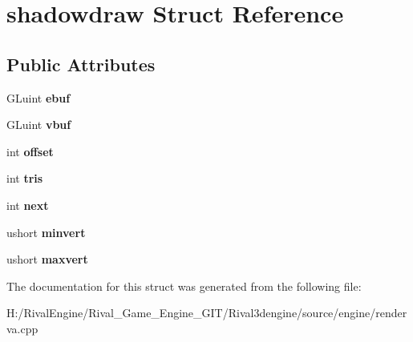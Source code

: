 \hypertarget{structshadowdraw}{}\section{shadowdraw Struct Reference}
\label{structshadowdraw}
\subsection*{Public Attributes}
\begin{DoxyCompactItemize}
\item 
\mbox{\label{structshadowdraw_a25b1392d77c3a07319fefe1782e7d95b}} 
G\+Luint {\bfseries ebuf}
\item 
\mbox{\label{structshadowdraw_a083ca69c763cac1ceaf7e893908b4a6d}} 
G\+Luint {\bfseries vbuf}
\item 
\mbox{\label{structshadowdraw_a301496aa1098b646b8eb2e47a01d5393}} 
int {\bfseries offset}
\item 
\mbox{\label{structshadowdraw_a4920a0cea65039924f56704ce01bf495}} 
int {\bfseries tris}
\item 
\mbox{\label{structshadowdraw_a85adde86f6235cc34c427780eea2b2fa}} 
int {\bfseries next}
\item 
\mbox{\label{structshadowdraw_a2000be2ccfad6949f1ad4a8038d62092}} 
ushort {\bfseries minvert}
\item 
\mbox{\label{structshadowdraw_a44cd3a21aefbce90dcd5c64c34e375b6}} 
ushort {\bfseries maxvert}
\end{DoxyCompactItemize}


The documentation for this struct was generated from the following file\+:\begin{DoxyCompactItemize}
\item 
H\+:/\+Rival\+Engine/\+Rival\+\_\+\+Game\+\_\+\+Engine\+\_\+\+G\+I\+T/\+Rival3dengine/source/engine/renderva.\+cpp\end{DoxyCompactItemize}

